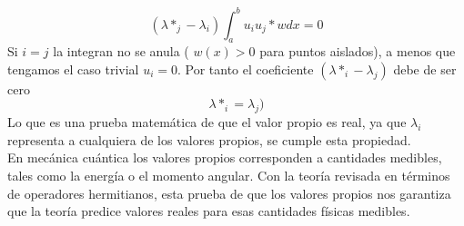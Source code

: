 \begin{equation}
(\lambda*_{j} - \lambda_{i}) \int_{a}^{b}  u_{i} u_{j}* w dx = 0
\label{eq:ecuacion_33}
\end{equation}
Si $i=j$ la integran no se anula ( $w(x) > 0$ para puntos aislados), a menos que tengamos el caso trivial $u_{i}=0$. Por tanto el coeficiente $(\lambda*_{i} - \lambda_{j})$ debe de ser cero
\begin{equation}
\lambda*_{i} = \lambda_{j})
\label{eq:ecuacion_34}
\end{equation}
Lo que es una prueba matemática de que el valor propio es real, ya que $\lambda_{i}$ representa a cualquiera de los valores propios, se cumple esta propiedad.
\\
En mecánica cuántica los valores propios corresponden a cantidades medibles, tales como la energía o el momento angular. Con la teoría revisada en términos de operadores hermitianos, esta prueba de que los valores propios nos garantiza que la teoría predice valores reales para esas cantidades físicas medibles.
